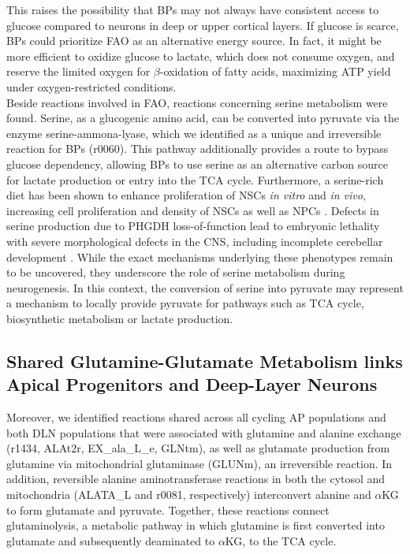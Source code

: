 This raises the possibility that BPs may not always have consistent access to glucose compared to neurons in deep or  upper cortical layers. If glucose is scarce, BPs could prioritize FAO as an alternative energy source. In fact, it might be more efficient to oxidize glucose to lactate, which does not consume oxygen, and reserve the limited oxygen for $\beta$-oxidation of fatty acids, maximizing ATP yield under oxygen-restricted conditions.
\\

Beside reactions involved in FAO, reactions concerning serine metabolism were found. Serine, as a glucogenic amino acid, can be converted into pyruvate via the  enzyme serine-ammona-lyase, which we identified as a unique and irreversible reaction for BPs (r0060). This pathway additionally provides a route to bypass glucose dependency, allowing BPs to use serine as an alternative carbon source for lactate production or entry into the TCA cycle. Furthermore, a serine-rich diet has been shown to enhance proliferation of NSCs 
\textit{in vitro} and \textit{in vivo}, increasing cell proliferation and density of NSCs as well as NPCs \citep{sultanDserineIncreasesAdult2013,than-trongLserineDietRestores2026,kawakamiImpairedNeurogenesisEmbryonic2009}.
Defects in serine production due to PHGDH loss-of-function lead to embryonic lethality with severe morphological defects in the CNS, including incomplete cerebellar development \citep{yoshidaTargetedDisruptionMouse2004}.
While the exact mechanisms underlying these phenotypes remain to be uncovered, they underscore the role of serine metabolism during neurogenesis. In this context, the conversion of serine into pyruvate may represent a mechanism to locally provide pyruvate for pathways such as TCA cycle, biosynthetic metabolism or lactate production.


\subsection{Shared Glutamine-Glutamate Metabolism links Apical Progenitors and Deep-Layer Neurons}
Moreover, we identified reactions shared across all cycling AP populations and both DLN populations that were associated with glutamine and alanine exchange (r1434, ALAt2r, EX\_ala\_L\_e, GLNtm), as well as glutamate production from glutamine via mitochondrial glutaminase (GLUNm), an irreversible reaction. In addition, reversible alanine aminotransferase reactions in both the cytosol and mitochondria (ALATA\_L and r0081, respectively) interconvert alanine and $\alpha$KG to form glutamate and pyruvate.  Together, these reactions connect glutaminolysis, a metabolic pathway in which glutamine is first converted into glutamate and subsequently deaminated to  $\alpha$KG, to the TCA cycle.
\\

